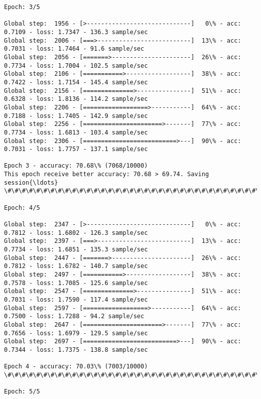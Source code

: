 \documentclass[11pt]{article}
\begin{document}
\begin{Verbatim}[commandchars=\\\{\}]
Epoch: 3/5

Global step:  1956 - [>-----------------------------]   0\% - acc: 0.7109 - loss: 1.7347 - 136.3 sample/sec
Global step:  2006 - [===>--------------------------]  13\% - acc: 0.7031 - loss: 1.7464 - 91.6 sample/sec
Global step:  2056 - [=======>----------------------]  26\% - acc: 0.7734 - loss: 1.7004 - 102.5 sample/sec
Global step:  2106 - [===========>------------------]  38\% - acc: 0.7422 - loss: 1.7154 - 145.4 sample/sec
Global step:  2156 - [==============>---------------]  51\% - acc: 0.6328 - loss: 1.8136 - 114.2 sample/sec
Global step:  2206 - [==================>-----------]  64\% - acc: 0.7188 - loss: 1.7405 - 142.9 sample/sec
Global step:  2256 - [======================>-------]  77\% - acc: 0.7734 - loss: 1.6813 - 103.4 sample/sec
Global step:  2306 - [==========================>---]  90\% - acc: 0.7031 - loss: 1.7757 - 137.1 sample/sec

Epoch 3 - accuracy: 70.68\% (7068/10000)
This epoch receive better accuracy: 70.68 > 69.74. Saving session{\ldots}
\#\#\#\#\#\#\#\#\#\#\#\#\#\#\#\#\#\#\#\#\#\#\#\#\#\#\#\#\#\#\#\#\#\#\#\#\#\#\#\#\#\#\#\#\#\#\#\#\#\#\#\#\#\#\#\#\#\#\#\#\#\#\#\#\#\#\#\#\#\#\#\#\#\#\#\#\#\#\#\#\#\#\#\#\#\#\#\#\#\#\#\#\#\#\#\#\#\#\#\#\#\#\#\#\#\#\#

Epoch: 4/5

Global step:  2347 - [>-----------------------------]   0\% - acc: 0.7812 - loss: 1.6802 - 126.3 sample/sec
Global step:  2397 - [===>--------------------------]  13\% - acc: 0.7734 - loss: 1.6851 - 135.3 sample/sec
Global step:  2447 - [=======>----------------------]  26\% - acc: 0.7812 - loss: 1.6782 - 140.7 sample/sec
Global step:  2497 - [===========>------------------]  38\% - acc: 0.7578 - loss: 1.7085 - 125.6 sample/sec
Global step:  2547 - [==============>---------------]  51\% - acc: 0.7031 - loss: 1.7590 - 117.4 sample/sec
Global step:  2597 - [==================>-----------]  64\% - acc: 0.7500 - loss: 1.7288 - 94.2 sample/sec
Global step:  2647 - [======================>-------]  77\% - acc: 0.7656 - loss: 1.6979 - 129.5 sample/sec
Global step:  2697 - [==========================>---]  90\% - acc: 0.7344 - loss: 1.7375 - 138.8 sample/sec

Epoch 4 - accuracy: 70.03\% (7003/10000)
\#\#\#\#\#\#\#\#\#\#\#\#\#\#\#\#\#\#\#\#\#\#\#\#\#\#\#\#\#\#\#\#\#\#\#\#\#\#\#\#\#\#\#\#\#\#\#\#\#\#\#\#\#\#\#\#\#\#\#\#\#\#\#\#\#\#\#\#\#\#\#\#\#\#\#\#\#\#\#\#\#\#\#\#\#\#\#\#\#\#\#\#\#\#\#\#\#\#\#\#\#\#\#\#\#\#\#

Epoch: 5/5


\end{Verbatim}
\end{document}
